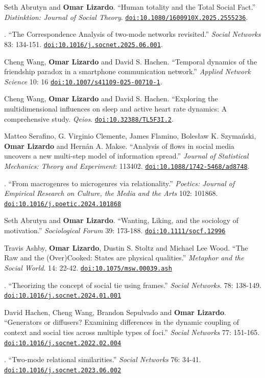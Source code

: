 

\ind Seth Abrutyn and {\bf Omar Lizardo}. ``Human totality and the Total Social Fact.'' {\em Distinktion: Journal of Social Theory}. \href{https://doi.org/10.1080/1600910X.2025.2555236}{\nolinkurl{doi:10.1080/1600910X.2025.2555236}}.

. ``The Correspondence Analysis of two-mode networks revisited.'' {\em Social Networks} 83: 134-151. \href{https://doi.org/10.1016/j.socnet.2025.06.001}{\nolinkurl{doi:10.1016/j.socnet.2025.06.001}}.

\ind Cheng Wang, {\bf Omar Lizardo} and David S. Hachen. ``Temporal dynamics of the friendship paradox in a smartphone communication network.'' {\em Applied Network Science} 10: 16 \href{https://doi.org/10.1007/s41109-025-00710-1}{\nolinkurl{doi:10.1007/s41109-025-00710-1}}.

\ind Cheng Wang, {\bf Omar Lizardo} and David S. Hachen. ``Exploring the multidimensional influences on sleep and active heart rate dynamics: A comprehensive study. {\em Qeios}. \href{https://doi.org/10.32388/TL5F3I.2}{\nolinkurl{doi:10.32388/TL5F3I.2}}.

\ind \ind Matteo Serafino, G. Virginio Clemente, James Flamino, Boles\l{}aw K. Szyma\'{n}ski, {\bf Omar Lizardo} and Hern\'{a}n A. Makse. ``Analysis of flows in social media uncovers a new multi-step model of information spread.'' {\em Journal of Statistical Mechanics: Theory and Experiment}: 113402. \href{https://doi.org/10.1088/1742-5468/ad8748}{\nolinkurl{doi:10.1088/1742-5468/ad8748}}.

. ``From macrogenres to microgenres via relationality.'' {\em Poetics: Journal of Empirical Research on Culture, the Media and the Arts} 102: 101868. \href{https://doi.org/10.1016/j.poetic.2024.101868}{\nolinkurl{doi:10.1016/j.poetic.2024.101868}}

\ind Seth Abrutyn and {\bf Omar Lizardo}. ``Wanting, Liking, and the sociology of motivation.'' {\em Sociological Forum} 39: 173-188. \href{https://doi.org/10.1111/socf.12996}{\nolinkurl{doi:10.1111/socf.12996}}

\ind Travis Ashby, {\bf Omar Lizardo}, Dustin S. Stoltz and Michael Lee Wood. ``The Raw and the (Over)Cooked: States are physical qualities.'' {\em Metaphor and the Social World}. 14: 22-42. \href{https://doi.org/10.1075/msw.00039.ash}{\nolinkurl{doi:10.1075/msw.00039.ash}}

. ``Theorizing the concept of social tie using frames.'' {\em Social Networks}. 78: 138-149. \href{https://doi.org/10.1016/j.socnet.2024.01.001}{\nolinkurl{doi:10.1016/j.socnet.2024.01.001}}

\ind David Hachen, Cheng Wang, Brandon Sepulvado and {\bf Omar Lizardo}. ``Generators or diffusers? Examining differences in the dynamic coupling of context and social ties across multiple types of foci.'' {\em Social Networks} 77: 151-165. \href{https://doi.org/10.1016/j.socnet.2022.02.004}{\nolinkurl{doi:10.1016/j.socnet.2022.02.004}}

. ``Two-mode relational similarities.'' {\em Social Networks}  76: 34-41. \href{https://doi.org/10.1016/j.socnet.2023.06.002}{\nolinkurl{doi:10.1016/j.socnet.2023.06.002}}
